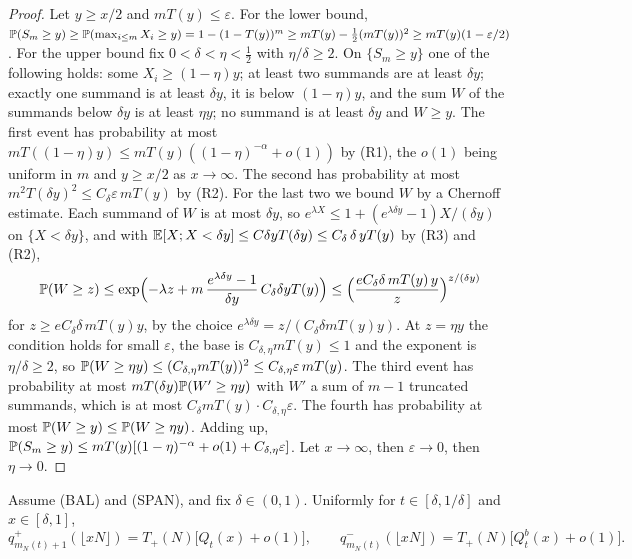 \begin{proof}
Let $y\ge x/2$ and $mT(y)\le\varepsilon$. For the lower bound,
$\mathbb{P}(S_m\ge y)\ge\mathbb{P}(\max_{i\le m}X_i\ge y)=1-(1-T(y))^m\ge mT(y)-\tfrac12(mT(y))^2\ge mT(y)(1-\varepsilon/2)$.
For the upper bound fix $0<\delta<\eta<\frac12$ with $\eta/\delta\ge2$. On
$\{S_m\ge y\}$ one of the following holds: some $X_i\ge(1-\eta)y$; at least two summands
are at least $\delta y$; exactly one summand is at least $\delta y$, it is below $(1-\eta)y$,
and the sum $W$ of the summands below $\delta y$ is at least $\eta y$; no summand is at least
$\delta y$ and $W\ge y$. The first event has probability at most
$mT((1-\eta)y)\le mT(y)((1-\eta)^{-\alpha}+o(1))$ by (R1), the $o(1)$ being uniform in $m$ and
$y\ge x/2$ as $x\to\infty$. The second has probability at most $m^2T(\delta y)^2\le C_\delta\varepsilon\,mT(y)$
by (R2). For the last two we bound $W$ by a Chernoff estimate. Each summand of $W$ is
at most $\delta y$, so $e^{\lambda X}\le1+(e^{\lambda\delta y}-1)X/(\delta y)$ on $\{X<\delta y\}$,
and with $\mathbb{E}[X;X<\delta y]\le C\delta yT(\delta y)\le C_\delta\,\delta\,yT(y)$ by (R3) and (R2),
\[
 \mathbb{P}(W\ge z)\le\exp\Bigl(-\lambda z+m\,\frac{e^{\lambda\delta y}-1}{\delta y}\,C_\delta\delta yT(y)\Bigr)
 \le\Bigl(\frac{eC_\delta\delta\,mT(y)\,y}{z}\Bigr)^{z/(\delta y)}
\]
for $z\ge eC_\delta\delta\,mT(y)y$, by the choice $e^{\lambda\delta y}=z/(C_\delta\delta mT(y)y)$. At
$z=\eta y$ the condition holds for small $\varepsilon$, the base is $C_{\delta,\eta}mT(y)\le1$ and the
exponent is $\eta/\delta\ge2$, so
$\mathbb{P}(W\ge\eta y)\le(C_{\delta,\eta}mT(y))^2\le C_{\delta,\eta}\varepsilon\,mT(y)$. The third event has probability at most
$mT(\delta y)\mathbb{P}(W'\ge\eta y)$ with $W'$ a sum of $m-1$ truncated summands, which is at most
$C_\delta mT(y)\cdot C_{\delta,\eta}\varepsilon$. The fourth has probability at most
$\mathbb{P}(W\ge y)\le\mathbb{P}(W\ge\eta y)$. Adding up,
$\mathbb{P}(S_m\ge y)\le mT(y)[(1-\eta)^{-\alpha}+o(1)+C_{\delta,\eta}\varepsilon]$. Let $x\to\infty$, then
$\varepsilon\to0$, then $\eta\to0$.
\end{proof}

\begin{lemma}\label{lem:kernel-limit}
Assume (BAL) and (SPAN), and fix $\delta\in(0,1)$. Uniformly for $t\in[\delta,1/\delta]$ and
$x\in[\delta,1]$,
\[
 q^\plus_{m_N(t)+1}(\lfloor xN\rfloor)=T_\plus(N)\bigl[Q_t(x)+o(1)\bigr],\qquad
 q^\minus_{m_N(t)}(\lfloor xN\rfloor)=T_\plus(N)\bigl[Q^b_t(x)+o(1)\bigr].
\]
\end{lemma}

